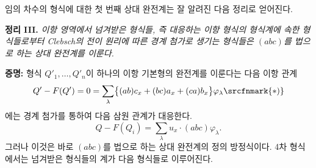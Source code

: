 
임의 차수의 형식에 대한 첫 번째 상대 완전계는 잘 알려진 다음 정리로 얻어진다.

\clearpage
\noindent\textbf{정리 III.}
\emph{이항 영역에서 넘겨받은 형식들, 즉 대응하는 이항 형식의 형식계에 속한 형식들로부터 Clebsch의 전이 원리에 따른 경계 첨가로 생기는 형식들은 $(abc)$를 법으로 하는 상대 완전계를 이룬다.}

\noindent\textbf{증명:}
형식 $Q'_1,\ldots,Q'_n$이 하나의 이항 기본형의 완전계를 이룬다는 다음 이항 관계
\[
Q'-F(Q')=0=\sum_\lambda\bigl\{(ab)c_x+(bc)a_x+(ca)b_x\bigr\}\varphi_\lambda\srcfnmark{*)}
\]
에는 경계 첨가를 통하여 다음 삼원 관계가 대응한다.
\[
Q-F(Q_i)=\sum_\lambda u_x\cdot(abc)\varphi_\lambda .
\]
그러나 이것은 바로 $(abc)$를 법으로 하는 상대 완전계의 정의 방정식이다. 4차 형식에서는 넘겨받은 형식들의 계가 다음 형식들로 이루어진다.
